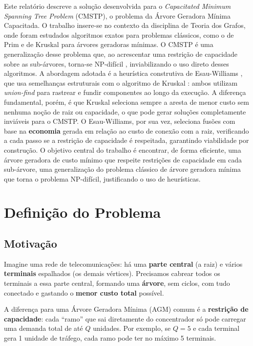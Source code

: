 \documentclass[12pt, a4paper]{article}
\begin{document}
Este relatório descreve a solução desenvolvida para o \textit{Capacitated Minimum Spanning Tree Problem} (CMSTP), o problema da Árvore Geradora Mínima Capacitada. O trabalho insere-se no contexto da disciplina de Teoria dos Grafos, onde foram estudados
algoritmos exatos para problemas clássicos, como o de Prim e de Kruskal para árvores geradoras mínimas. O CMSTP é uma generalização desse problema que, ao acrescentar uma restrição de capacidade sobre as sub-árvores, torna-se NP-difícil \cite{garey1979}, inviabilizando o uso direto desses algoritmos.
A abordagem adotada é a heurística construtiva de Esau-Williams \cite{esauwilliams1966}, que usa semelhanças estruturais com o algoritmo de Kruskal \cite{kruskal1956}: ambos utilizam \textit{union-find} para rastrear e fundir componentes ao longo da execução. A diferença fundamental, porém, é que Kruskal seleciona sempre a aresta de menor custo sem nenhuma noção de raiz ou capacidade, o que pode gerar soluções completamente inviáveis para o CMSTP. O Esau-Williams, por sua vez, seleciona fusões com base na \textbf{economia} gerada em relação ao custo de conexão com a raiz, verificando a cada passo se a restrição de capacidade é respeitada, garantindo viabilidade por construção.
O objetivo central do trabalho é encontrar, de forma eficiente, uma árvore geradora de custo mínimo que respeite restrições de capacidade em cada sub-árvore, uma generalização do problema clássico de árvore geradora mínima que torna o problema NP-difícil, justificando o uso de heurísticas.

\section{Definição do Problema}

\subsection{Motivação}

Imagine uma rede de telecomunicações: há uma \textbf{parte central} (a raiz) e vários \textbf{terminais} espalhados (os demais vértices). Precisamos cabrear todos os terminais a essa parte central, formando uma \textbf{árvore}, sem ciclos, com tudo conectado e gastando o \textbf{menor custo total} possível.

A diferença para uma Árvore Geradora Mínima (AGM) comum é a \textbf{restrição de capacidade}: cada ``ramo'' que sai diretamente do concentrador só pode carregar uma demanda total de até $Q$ unidades. Por exemplo, se $Q = 5$ e cada terminal gera 1 unidade de tráfego, cada ramo pode ter no máximo 5 terminais.
\end{document}
